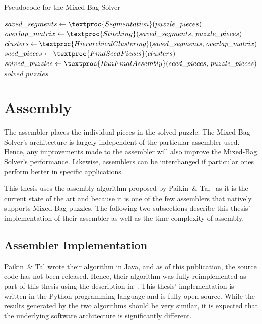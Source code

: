 \begin{algorithm}[t]
  \caption{Pseudocode for the Mixed-Bag Solver}\label{alg:mixedBagSolver}
  \begin{algorithmic}[1]
      \State $saved\_segments \gets \textproc{Segmentation}\text{(} puzzle\hspace{-0.8pt}\_pieces \text{)}$
      \State $overlap\_matrix \gets \textproc{Stitching}\text{(} saved\_segments \text{, } puzzle\hspace{-0.8pt}\_pieces \text{)}$
      \State $clusters \gets \textproc{HierarchicalClustering} \text{(}saved\_segments \text{, } overlap\_matrix \text{)}$
      \State $seed\_pieces \gets \textproc{FindSeedPieces} \text{(} clusters \text{)}$
      \State $solved\_puzzles \gets \textproc{RunFinalAssembly} \text{(} seed\_pieces \text{, } puzzle\hspace{-0.8pt}\_pieces \text{)}$
      \State \Return $solved\_puzzles$
    \EndFunction
  \end{algorithmic}
\end{algorithm}

\section{Assembly}\label{sec:SolverAssembler}

The assembler places the individual pieces in the solved puzzle.  The Mixed-Bag Solver's architecture is largely independent of the particular assembler used.  Hence, any improvements made to the assembler will also improve the Mixed-Bag Solver's performance.  Likewise, assemblers can be interchanged if particular ones perform better in specific applications.  

This thesis uses the assembly algorithm proposed by Paikin~\& Tal~\cite{paikin2015} as it is the current state of the art and because it is one of the few assemblers that natively supports Mixed-Bag puzzles.  The following two subsections describe this thesis' implementation of their assembler as well as the time complexity of assembly.

\subsection{Assembler Implementation}\label{sec:assemblerImplementation}

Paikin~\& Tal wrote their algorithm in Java, and as of this publication, the source code has not been released.  Hence, their algorithm was fully reimplemented as part of this thesis using the description in~\cite{paikin2015}.  This thesis' implementation is written in the Python programming language and is fully open-source. While the results generated by the two algorithms should be very similar, it is expected that the underlying software architecture is significantly different. 

